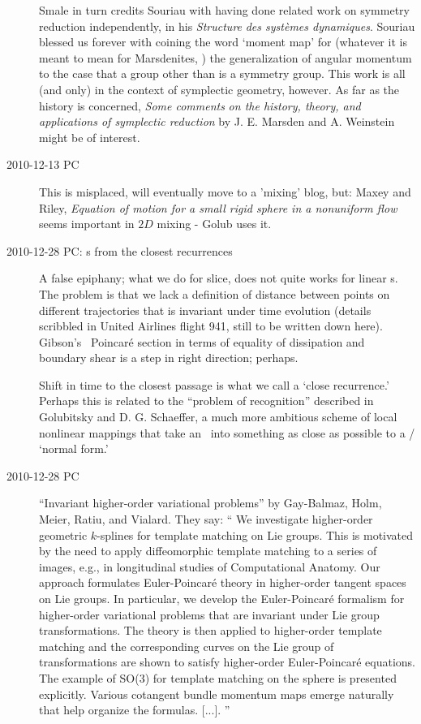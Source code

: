 \begin{description}
Smale in turn credits Souriau with having done related
work on symmetry reduction independently, in his
{\emph{Structure}} \emph{des syst\`emes dynamiques}. Souriau blessed us forever with
coining the word `moment map' for (whatever it is meant to mean for Marsdenites,
\ie)
the generalization of angular momentum to the case that a group other than
{} is a symmetry group.
This work is all (and only) in the
context of symplectic geometry, however. As far as the history is concerned,
{\emph{Some comments}} \emph{on the history, theory, and applications of
symplectic reduction} by J. E. Marsden and A. Weinstein
might be of interest.

\item[2010-12-13 PC]
This is misplaced, will eventually move to a 'mixing' blog, but:
Maxey and Riley,
{\em Equation of motion for a small rigid sphere in a nonuniform flow}
seems important in $2D$ mixing - Golub uses it.

\item[2010-12-28 PC:
{\PoincSec}s from the closest recurrences]
A false epiphany; what we do for slice, does not quite works for linear
{\PoincSec}s.
The problem is that we lack a definition of distance
between points on different trajectories that is invariant under time
evolution (details scribbled in United Airlines flight 941, still to be
written down here). Gibson's \pCf\ Poincar\'e section in terms of
equality of dissipation and boundary shear is a step in right direction;
perhaps.

Shift in time to the closest passage is what we
call a
`close recurrence.' Perhaps this is related to the ``problem of recognition''
described in Golubitsky and D. G. Schaeffer, a much more
ambitious scheme of local nonlinear mappings that take an \eqv\ into
something as close as possible to a {\template} / `normal form.'

\item[2010-12-28 PC]
{``Invariant higher-order variational problems''}
by Gay-Balmaz, Holm, Meier,  Ratiu, and Vialard. They say: ``
We investigate higher-order geometric $k$-splines for template matching
on Lie groups. This is motivated by the need to apply diffeomorphic
template matching to a series of images, e.g., in longitudinal studies of
Computational Anatomy. Our approach formulates Euler-Poincar\'e theory in
higher-order tangent spaces on Lie groups. In particular, we develop the
Euler-Poincar\'e formalism for higher-order variational problems that are
invariant under Lie group transformations. The theory is then applied to
higher-order template matching and the corresponding curves on the Lie
group of transformations are shown to satisfy higher-order
Euler-Poincar\'{e} equations. The example of SO(3) for template matching
on the sphere is presented explicitly. Various cotangent bundle momentum
maps emerge naturally that help organize the formulas. [...].
''


\end{description}
